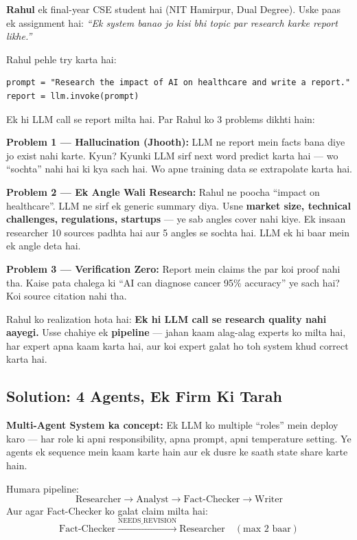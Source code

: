 \documentclass[11pt, a4paper]{article}
\begin{document}
\begin{storybox}
\textbf{Rahul} ek final-year CSE student hai (NIT Hamirpur, Dual Degree). Uske paas ek assignment hai: \textit{``Ek system banao jo kisi bhi topic par research karke report likhe.''}

Rahul pehle try karta hai:
\begin{verbatim}
prompt = "Research the impact of AI on healthcare and write a report."
report = llm.invoke(prompt)
\end{verbatim}

Ek hi LLM call se report milta hai. Par Rahul ko 3 problems dikhti hain:

\textbf{Problem 1 --- Hallucination (Jhooth):} LLM ne report mein facts bana diye jo exist nahi karte. Kyun? Kyunki LLM sirf next word predict karta hai --- wo ``sochta'' nahi hai ki kya sach hai. Wo apne training data se extrapolate karta hai.

\textbf{Problem 2 --- Ek Angle Wali Research:} Rahul ne poocha ``impact on healthcare''. LLM ne sirf ek generic summary diya. Usne \textbf{market size, technical challenges, regulations, startups} --- ye sab angles cover nahi kiye. Ek insaan researcher 10 sources padhta hai aur 5 angles se sochta hai. LLM ek hi baar mein ek angle deta hai.

\textbf{Problem 3 --- Verification Zero:} Report mein claims the par koi proof nahi tha. Kaise pata chalega ki ``AI can diagnose cancer 95\% accuracy'' ye sach hai? Koi source citation nahi tha.

Rahul ko realization hota hai: \textbf{Ek hi LLM call se research quality nahi aayegi.} Usse chahiye ek \textbf{pipeline} --- jahan kaam alag-alag experts ko milta hai, har expert apna kaam karta hai, aur koi expert galat ho toh system khud correct karta hai.
\end{storybox}

\subsection{Solution: 4 Agents, Ek Firm Ki Tarah}

\begin{conceptbox}
\textbf{Multi-Agent System ka concept:} Ek LLM ko multiple ``roles'' mein deploy karo --- har role ki apni responsibility, apna prompt, apni temperature setting. Ye agents ek sequence mein kaam karte hain aur ek dusre ke saath state share karte hain.

Humara pipeline:
\[
\text{Researcher} \longrightarrow \text{Analyst} \longrightarrow \text{Fact-Checker} \longrightarrow \text{Writer}
\]
Aur agar Fact-Checker ko galat claim milta hai:
\[
\text{Fact-Checker} \xrightarrow{\text{NEEDS\_REVISION}} \text{Researcher} \quad (\text{max 2 baar})
\]
\end{conceptbox}
\end{document}
